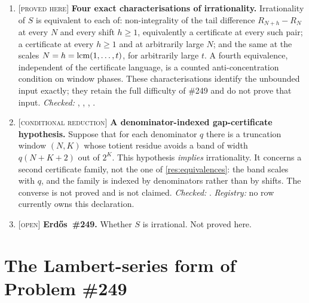 \documentclass[11pt]{article}
\newcommand{\Stot}{S}
\newcommand{\stag}[1]{{\normalfont\footnotesize\textsc{[#1]}}}
\begin{document}
{\begin{enumerate}[label=\textbf{R\arabic*.},ref=R\arabic*,leftmargin=2.4em,
  itemsep=0.2em,topsep=0.25em]
\item\label{res:equivalences} \stag{proved here}
\textbf{Four exact characterisations of irrationality.}  Irrationality
of $\Stot$ is equivalent to each of: non-integrality of the tail difference
$R_{N+h}-R_N$ at every $N$ and every shift $h\ge1$, equivalently a certificate
at every such pair; a certificate at every $h\ge1$ and at arbitrarily large
$N$; and the same at the scales $N=h=\operatorname{lcm}(1,\dots,t)$, for arbitrarily large
$t$.  A fourth equivalence,
independent of the certificate language, is a counted anti-concentration
condition on window phases.  These characterisations identify the unbounded
input exactly; they retain the full difficulty of \#249 and do not prove that
input.
{\footnotesize\emph{Checked:}
,
,
,
.}

\item\label{res:supply} \stag{conditional reduction}
\textbf{A denominator-indexed gap-certificate hypothesis.}  Suppose that for
each denominator $q$ there is a truncation window $(N,K)$ whose totient residue
avoids a band of width $q(N{+}K{+}2)$ out of $2^K$.  This hypothesis
\emph{implies} irrationality.  It concerns a second certificate family, not
the one of \ref{res:equivalences}: the band scales with $q$, and the family is
indexed by denominators rather than by shifts.  The converse is not proved and
is not claimed.
{\footnotesize\emph{Checked:}
.
\emph{Registry:} no row currently owns this declaration.}

\item\label{res:open} \stag{open}
\textbf{Erd\H{o}s~\#249.}  Whether $\Stot$ is irrational.  Not proved here.

\end{enumerate}
}

\section{The Lambert-series form of Problem \#249}\label{sec:family}
\end{document}
